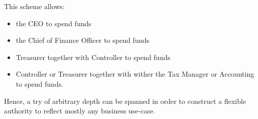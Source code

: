 This scheme allows:

\begin{itemize}
 \item the CEO to spend funds
 \item the Chief of Finance Officer to spend funds
 \item Treasurer together with Controller to spend funds
 \item Controller or Treasurer together with wither the Tax Manager or Accounting to
       spend funds.
\end{itemize}

Hence, a try of arbitrary depth can be spanned in order to construct a flexible
authority to reflect mostly any business use-case.

